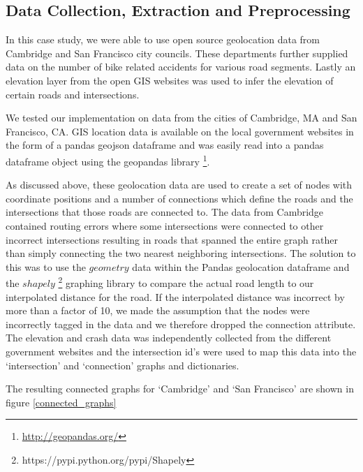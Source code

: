 \documentclass[11pt]{article}
\begin{document}
\subsection{Data Collection, Extraction and Preprocessing}
In this case study, we were able to use open source geolocation data from Cambridge and San Francisco city councils. These departments further supplied data on the number of bike related accidents for various road segments. Lastly an elevation layer from the open GIS websites was used to infer the elevation of certain roads and intersections.

We tested our implementation on data from the cities of Cambridge, MA and San Francisco, CA. GIS location data is available on the local government websites in the form of a pandas geojson dataframe and was easily read into a pandas dataframe object using the geopandas library \footnote{\url{http://geopandas.org/}}.
\par
As discussed above, these geolocation data are used to create a set of nodes with coordinate positions and a number of connections which define the roads and the intersections that those roads are connected to. The data from Cambridge contained routing errors where some intersections were connected to other incorrect intersections resulting in roads that spanned the entire graph rather than simply connecting the two nearest neighboring intersections. The solution to this was to use the $geometry$ data within the Pandas geolocation dataframe and the $shapely$ \footnote{https://pypi.python.org/pypi/Shapely} graphing library to compare the actual road length to our interpolated distance for the road. If the interpolated distance was incorrect by more than a factor of 10, we made the assumption that the nodes were incorrectly tagged in the data and we therefore dropped the connection attribute. The elevation and crash data was independently collected from the different government websites and the intersection id's were used to map this data into the `intersection' and `connection' graphs and dictionaries.
\par The resulting connected graphs for `Cambridge' and `San Francisco' are shown in figure \ref{connected_graphs}
\end{document}
